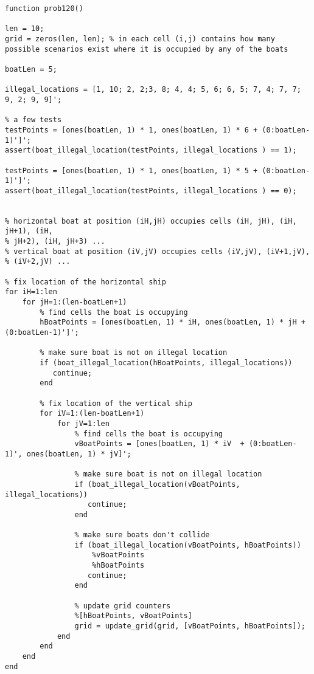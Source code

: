 \documentclass[11pt,a4paper,oneside]{report}
\begin{document}
\begin{lstlisting}
function prob120()

len = 10;
grid = zeros(len, len); % in each cell (i,j) contains how many possible scenarios exist where it is occupied by any of the boats

boatLen = 5;

illegal_locations = [1, 10; 2, 2;3, 8; 4, 4; 5, 6; 6, 5; 7, 4; 7, 7; 9, 2; 9, 9]';

% a few tests
testPoints = [ones(boatLen, 1) * 1, ones(boatLen, 1) * 6 + (0:boatLen-1)']'; 
assert(boat_illegal_location(testPoints, illegal_locations ) == 1);

testPoints = [ones(boatLen, 1) * 1, ones(boatLen, 1) * 5 + (0:boatLen-1)']'; 
assert(boat_illegal_location(testPoints, illegal_locations ) == 0);


% horizontal boat at position (iH,jH) occupies cells (iH, jH), (iH, jH+1), (iH,
% jH+2), (iH, jH+3) ...
% vertical boat at position (iV,jV) occupies cells (iV,jV), (iV+1,jV),
% (iV+2,jV) ...

% fix location of the horizontal ship
for iH=1:len
    for jH=1:(len-boatLen+1)
        % find cells the boat is occupying
        hBoatPoints = [ones(boatLen, 1) * iH, ones(boatLen, 1) * jH + (0:boatLen-1)']';  
        
        % make sure boat is not on illegal location
        if (boat_illegal_location(hBoatPoints, illegal_locations))
           continue; 
        end    
        
        % fix location of the vertical ship
        for iV=1:(len-boatLen+1)
            for jV=1:len
                % find cells the boat is occupying
                vBoatPoints = [ones(boatLen, 1) * iV  + (0:boatLen-1)', ones(boatLen, 1) * jV]'; 
                        
                % make sure boat is not on illegal location
                if (boat_illegal_location(vBoatPoints, illegal_locations))
                   continue; 
                end    
                
                % make sure boats don't collide
                if (boat_illegal_location(vBoatPoints, hBoatPoints))
                    %vBoatPoints
                    %hBoatPoints
                   continue; 
                end

                % update grid counters
                %[hBoatPoints, vBoatPoints]
                grid = update_grid(grid, [vBoatPoints, hBoatPoints]);
            end
        end
    end
end



\end{lstlisting}
\end{document}
